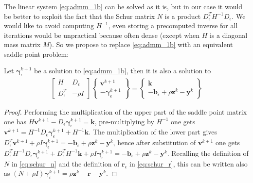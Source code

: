 \documentclass[AMA,STIX1COL]{WileyNJD-v2}
\newcommand{\vect}[1]{\bm{#1}}
\begin{document}

The linear system \eqref{eq:admm_1b} can be solved as it is, but in our case it would be better to exploit the fact that the Schur matrix $N$ is a product $D_\epsilon^T H^{-1} D_\epsilon$. We would like to avoid computing $H^{-1}$, even storing a precomputed inverse for all iterations would be unpractical because often dense (except when $H$ is a diagonal mass matrix $M$). So we propose to replace \eqref{eq:admm_1b} with an equivalent saddle point problem: 

\begin{theorem}
\label{th:schurtokkt}
Let $\vect{\gamma}_\epsilon^{k+1}$ be a solution to \eqref{eq:admm_1b}, then it is also a solution to
%
\begin{subequations}
	\begin{align}
    \begin{bmatrix}
		 H   & D_\epsilon \\
		 D_\epsilon^T & - \rho I
		\end{bmatrix}
		\begin{Bmatrix}
		 \vect{v}^{k+1}   \\
		 -\vect{\gamma}_\epsilon^{k+1} 
		\end{Bmatrix}
		=
		\begin{Bmatrix}
		 \vect{k} \\
		 -\vect{b}_\epsilon + \rho \vect{z}^k -\vect{y}^k 
		\end{Bmatrix}
	\end{align}
	\label{eq:admm_1c}
\end{subequations}
%
\end{theorem}

\begin{proof}
Performing the multiplication of the upper part of the saddle point matrix one has 
$H \vect{v}^{k+1} - D_\epsilon \vect{\gamma}_\epsilon^{k+1} = \vect{k}$,
pre-multiplying by $H^{-1}$ one gets 
$\vect{v}^{k+1} = H^{-1} D_\epsilon \vect{\gamma}_\epsilon^{k+1} + H^{-1} \vect{k}$. 
The multiplication of the lower part gives 
$D_\epsilon^T \vect{v}^{k+1} + \rho I \vect{\gamma}_\epsilon^{k+1} = -\vect{b}_\epsilon + \rho \vect{z}^k -\vect{y}^k $, 
hence after substitution of $\vect{v}^{k+1}$ one gets
$D_\epsilon^T H^{-1} D_\epsilon \vect{\gamma}_\epsilon^{k+1}  + D_\epsilon^T H^{-1} \vect{k} + \rho I \vect{\gamma}_\epsilon^{k+1} = -\vect{b}_\epsilon + \rho \vect{z}^k -\vect{y}^k$. 
Recalling the definition of $N$ in \eqref{eq:schur_n} and the definition of $\vect{r}_\epsilon$ in \eqref{eq:schur_r}, this can be written also as 
$(N + \rho I) \vect{\gamma}_\epsilon^{k+1} =  \rho \vect{z}^k - \vect{r} - \vect{y}^k$. 
\end{proof}
\end{document}
